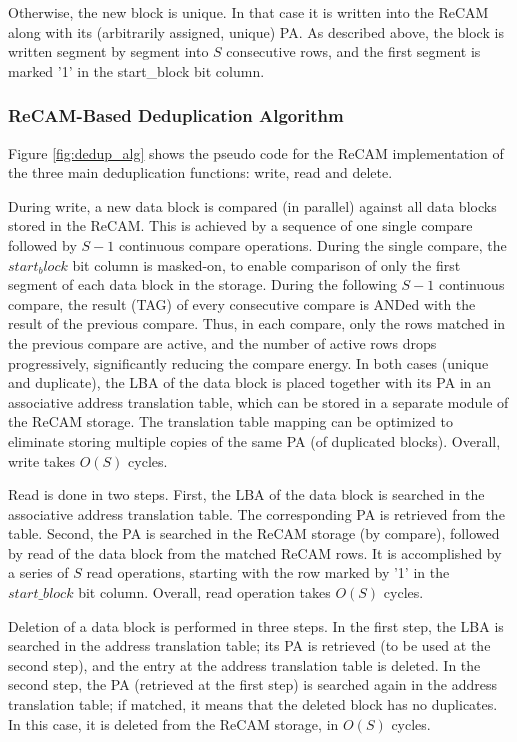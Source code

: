 \documentclass{superfri}
\begin{document}
	
	Otherwise, the new block is unique. In that case it is written into the ReCAM along with its (arbitrarily assigned, unique) PA. As described above, the block is written segment by segment into $S$ consecutive rows, and the first segment is marked '1' in the start\_block bit column. 
	
	\subsubsection{ReCAM-Based Deduplication Algorithm}
	
	Figure \ref{fig:dedup_alg} shows the pseudo code for the ReCAM implementation of the three main deduplication functions: write, read and delete.
	
	During write, a new data block is compared (in parallel) against all data blocks stored in the ReCAM. This is achieved by a sequence of one single compare followed by $S-1$ continuous compare operations. During the single compare, the $start_block$ bit column is masked-on, to enable comparison of only the first segment of each data block in the storage. During the following $S-1$ continuous compare, the result (TAG) of every consecutive compare is ANDed with the result of the previous compare. Thus, in each compare, only the rows matched in the previous compare are active, and the number of active rows drops progressively, significantly reducing the compare energy. In both cases (unique and duplicate), the LBA of the data block is placed together with its PA in an associative address translation table, which can be stored in a separate module of the ReCAM storage. The translation table mapping can be optimized to eliminate storing multiple copies of the same PA (of duplicated blocks). Overall, write takes $O(S)$ cycles.  
	
	Read is done in two steps. First, the LBA of the data block is searched in the associative address translation table. The corresponding PA is retrieved from the table. Second, the PA is searched in the ReCAM storage (by compare), followed by read of the data block from the matched ReCAM rows. It is accomplished by a series of $S$ read operations, starting with the row marked by '1' in the $start\_block$ bit column. Overall, read operation takes $O(S)$ cycles.  
	
	Deletion of a data block is performed in three steps. In the first step, the LBA is searched in the address translation table; its PA is retrieved (to be used at the second step), and the entry at the address translation table is deleted. In the second step, the PA (retrieved at the first step) is searched again in the address translation table; if matched, it means that the deleted block has no duplicates. In this case, it is deleted from the ReCAM storage, in $O(S)$ cycles.
	
\end{document}
